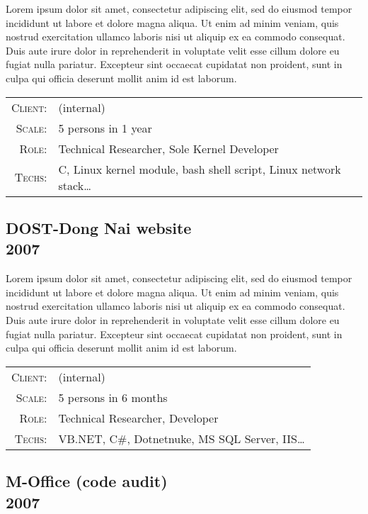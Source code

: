 \documentclass[a4paper,10pt]{article}
\begin{document}
Lorem ipsum dolor sit amet, consectetur adipiscing elit, sed do eiusmod tempor incididunt ut labore et dolore magna aliqua. Ut enim ad minim veniam, quis nostrud exercitation ullamco laboris nisi ut aliquip ex ea commodo consequat. Duis aute irure dolor in reprehenderit in voluptate velit esse cillum dolore eu fugiat nulla pariatur. Excepteur sint occaecat cupidatat non proident, sunt in culpa qui officia deserunt mollit anim id est laborum.

\begin{tabular}{rl}
    \textsc{Client:} & \small(internal) \\
    \textsc{Scale:} & 5 persons in 1 year\\
    \textsc{Role:} & Technical Researcher, Sole Kernel Developer\\
    \textsc{Techs:} & C, Linux kernel module, bash shell script, Linux network stack\ldots\\
\end{tabular}

\subsection*{DOST-Dong Nai website\\\small 2007}

Lorem ipsum dolor sit amet, consectetur adipiscing elit, sed do eiusmod tempor incididunt ut labore et dolore magna aliqua. Ut enim ad minim veniam, quis nostrud exercitation ullamco laboris nisi ut aliquip ex ea commodo consequat. Duis aute irure dolor in reprehenderit in voluptate velit esse cillum dolore eu fugiat nulla pariatur. Excepteur sint occaecat cupidatat non proident, sunt in culpa qui officia deserunt mollit anim id est laborum.

\begin{tabular}{rl}
    \textsc{Client:} & \small(internal) \\
    \textsc{Scale:} & 5 persons in 6 months\\
    \textsc{Role:} & Technical Researcher, Developer\\
    \textsc{Techs:} & VB.NET, C\#, Dotnetnuke, MS SQL Server, IIS\ldots\\
\end{tabular}

\subsection*{M-Office (code audit)\\\small 2007}
\end{document}
